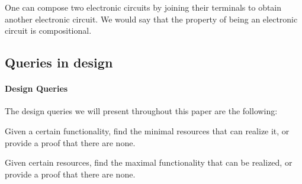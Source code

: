 \begin{example}
One can compose two electronic circuits by joining their terminals to obtain
another electronic circuit. We would say that the property
of being an electronic circuit is compositional.
\end{example}



\subsection{Queries in design}

\paragraph{Design Queries} The design queries we will present throughout this paper are the following:
\begin{compactitem}
\item Given a certain functionality, find the minimal resources that can realize it, or provide a proof that there are none.
\item Given certain resources, find the maximal functionality that can be realized, or provide a proof that there are none.
\end{compactitem}



